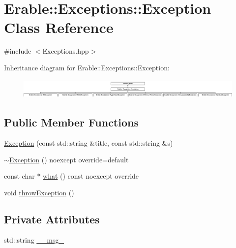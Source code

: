 \hypertarget{class_erable_1_1_exceptions_1_1_exception}{}\section{Erable\+::Exceptions\+::Exception Class Reference}
\label{class_erable_1_1_exceptions_1_1_exception}


{\ttfamily \#include $<$Exceptions.\+hpp$>$}

Inheritance diagram for Erable\+::Exceptions\+::Exception\+:\begin{figure}[H]
\begin{center}
\leavevmode
\includegraphics[height=1.025641cm]{class_erable_1_1_exceptions_1_1_exception}
\end{center}
\end{figure}
\subsection*{Public Member Functions}
\begin{DoxyCompactItemize}
\item 
\mbox{\hyperlink{class_erable_1_1_exceptions_1_1_exception_ad095b2ed3598f81f6d8d548f2cf8f447}{Exception}} (const std\+::string \&title, const std\+::string \&s)
\item 
\mbox{\hyperlink{class_erable_1_1_exceptions_1_1_exception_a7f390dadbfe12735322fdf00accd6317}{$\sim$\+Exception}} () noexcept override=default
\item 
const char $\ast$ \mbox{\hyperlink{class_erable_1_1_exceptions_1_1_exception_a518bc32efd98b49272ade5d2b5aee8cd}{what}} () const noexcept override
\item 
void \mbox{\hyperlink{class_erable_1_1_exceptions_1_1_exception_a170adc322325fb30be6be2f9c1462ab2}{throw\+Exception}} ()
\end{DoxyCompactItemize}
\subsection*{Private Attributes}
\begin{DoxyCompactItemize}
\item 
std\+::string \mbox{\hyperlink{class_erable_1_1_exceptions_1_1_exception_a660f187522179967a29ff896e61b2165}{\+\_\+\+\_\+msg\+\_\+}}
\end{DoxyCompactItemize}


